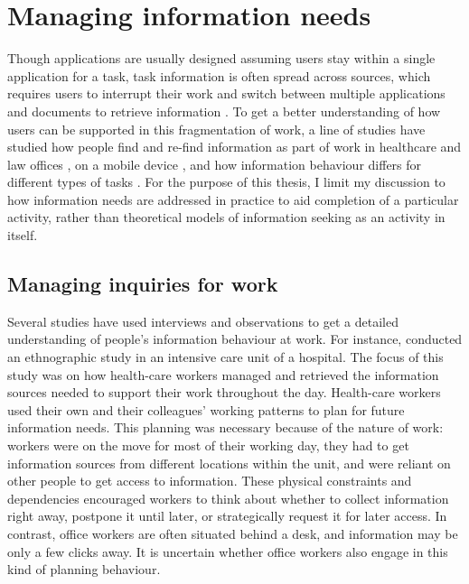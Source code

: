\section{Managing information needs}
Though applications are usually designed assuming users stay within a single application for a task, task information is often spread across sources, which requires users to interrupt their work and switch between multiple applications and documents to retrieve information \citep{Cangiano2009, Czerwinski2004, Mark2005, Sellberg2014}. To get a better understanding of how users can be supported in this fragmentation of work, a line of studies have studied how people find and re-find information as part of work in healthcare \citep{Reddy2002} and law offices \citep{Cangiano2009, Makri2008b}, on a mobile device \citep{Sohn2008}, and how information behaviour differs for different types of tasks \citep{Bondarenko2005}. For the purpose of this thesis, I limit my discussion to how information needs are addressed in practice to aid completion of a particular activity, rather than theoretical models of information seeking as an activity in itself.

\subsection{Managing inquiries for work}
Several studies have used interviews and observations to get a detailed understanding of people's information behaviour at work. For instance, \citet{Reddy2002} conducted an ethnographic study in an intensive care unit of a hospital. The focus of this study was on how health-care workers managed and retrieved the information sources needed to support their work throughout the day. Health-care workers used their own and their colleagues' working patterns to plan for future information needs. This planning was necessary because of the nature of work: workers were on the move for most of their working day, they had to get information sources from different locations within the unit, and were reliant on other people to get access to information. These physical constraints and dependencies encouraged workers to think about whether to collect information right away, postpone it until later, or strategically request it for later access. In contrast, office workers are often situated behind a desk, and information may be only a few clicks away. It is uncertain whether office workers also engage in this kind of planning behaviour. 

